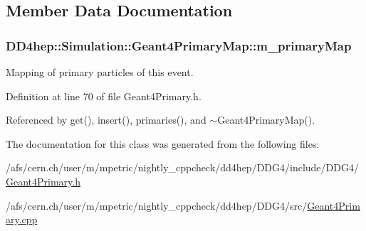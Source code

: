 \subsection{Member Data Documentation}
\hypertarget{class_d_d4hep_1_1_simulation_1_1_geant4_primary_map_aa3b3cffcec11c5ced24ca4f9ac4e6bde}{
\subsubsection[{m\_\-primaryMap}]{ {\bf DD4hep::Simulation::Geant4PrimaryMap::m\_\-primaryMap}}}
\label{class_d_d4hep_1_1_simulation_1_1_geant4_primary_map_aa3b3cffcec11c5ced24ca4f9ac4e6bde}


Mapping of primary particles of this event. 

Definition at line 70 of file Geant4Primary.h.

Referenced by get(), insert(), primaries(), and $\sim$Geant4PrimaryMap().

The documentation for this class was generated from the following files:\begin{DoxyCompactItemize}
\item 
/afs/cern.ch/user/m/mpetric/nightly\_\-cppcheck/dd4hep/DDG4/include/DDG4/\hyperlink{_geant4_primary_8h}{Geant4Primary.h}\item 
/afs/cern.ch/user/m/mpetric/nightly\_\-cppcheck/dd4hep/DDG4/src/\hyperlink{_geant4_primary_8cpp}{Geant4Primary.cpp}\end{DoxyCompactItemize}
